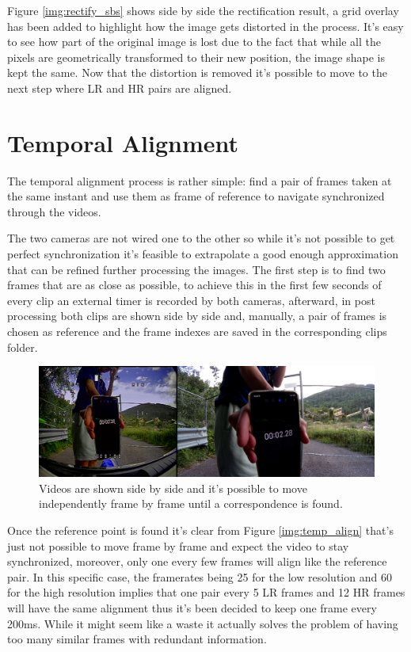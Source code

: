 Figure \ref{img:rectify_sbs} shows side by side the rectification result, a grid overlay has been added to highlight how the image gets distorted in the process. It's easy to see how part of the original image is lost due to the fact that while all the pixels are geometrically transformed to their new position, the image shape is kept the same. Now that the distortion is removed it's possible to move to the next step where LR and HR pairs are aligned.

\section{Temporal Alignment}
\label{sec:temp_align}

The temporal alignment process is rather simple: find a pair of frames taken at the same instant and use them as frame of reference to navigate synchronized through the videos.

The two cameras are not wired one to the other so while it's not possible to get perfect synchronization it's feasible to extrapolate a good enough approximation that can be refined further processing the images. The first step is to find two frames that are as close as possible, to achieve this in the first few seconds of every clip an external timer is recorded by both cameras, afterward, in post processing both clips are shown side by side and, manually, a pair of frames is chosen as reference and the frame indexes are saved in the corresponding clips folder.

\begin{figure}[H]
  \centering
  \includegraphics[scale=0.4]{figures/time_sync.png}
  \caption{Videos are shown side by side and it's possible to move independently frame by frame until a correspondence is found.}
  \label{img:time_sync}
\end{figure}

Once the reference point is found it's clear from Figure \ref{img:temp_align} that's just not possible to move frame by frame and expect the video to stay synchronized, moreover, only one every few frames will align like the reference pair. In this specific case, the framerates being 25 for the low resolution and 60 for the high resolution implies that one pair every 5 LR frames and 12 HR frames will have the same alignment thus it's been decided to keep one frame every 200ms. While it might seem like a waste it actually solves the problem of having too many similar frames with redundant information.

